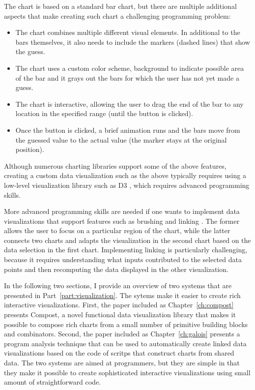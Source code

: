 \documentclass[fleqn,11pt]{report}
\theoremstyle{definition}
\newenvironment{nitemize}
{ \vspace{-0.4em}
  \begin{itemize}
    \setlength{\itemsep}{5pt}
    \setlength{\parskip}{0pt}
    \setlength{\parsep}{0pt} }
{ \end{itemize}
  \vspace{-0.4em} }
\begin{document}
The chart is based on a standard bar chart, but there are multiple additional aspects that
make creating such chart a challenging programming problem:

\begin{nitemize}
\item The chart combines multiple different visual elements. In additional to the bars themselves,
  it also needs to include the markers (dashed lines) that show the guess.
\item The chart uses a custom color scheme, background to indicate possible area of the bar and it
  grays out the bars for which the user has not yet made a guess.
\item The chart is interactive, allowing the user to drag the end of the bar to any location in
  the specified range (until the button is clicked).
\item Once the button is clicked, a brief animation runs and the bars move from the guessed
  value to the actual value (the marker stays at the original position).
\end{nitemize}

Although numerous charting libraries support some of the above features, creating a custom
data visualization such as the above typically requires using a low-level visualization library
such as D3 \citep{bostock-2011-d3}, which requires advanced programming skills.

More advanced programming skills are needed if one wants to implement data visualizations
that support features such as brushing and linking \citep{buja-1991-linking}. The former allows
the user to focus on a particular region of the chart, while the latter connects two charts and
adapts the visualization in the second chart based on the data selection in the first chart.
Implementing linking is particularly challenging, because it requires understanding what
inputs contributed to the selected data points and then recomputing the data displayed in the
other visualization.

In the following two sections, I provide an overview of two systems that are presented in
Part~\ref{part:visualization}. The sytems make it easier to create rich interactive
visualizations. First, the paper included as Chapter~\ref{ch:compost} presents Compost, a novel
functional data visualization library that makes it possible to compose rich charts
from a small number of primitive building blocks and combinators.
Second, the paper included as Chapter~\ref{ch:galois}
presents a program analysis technique that can be used to automatically create linked data
visualizations based on the code of scritps that construct charts from shared data.
The two systems are aimed at programmers, but they are simple in that they make it possible
to create sophisticated interactive visualizations using small amount of straightforward code.
\end{document}
